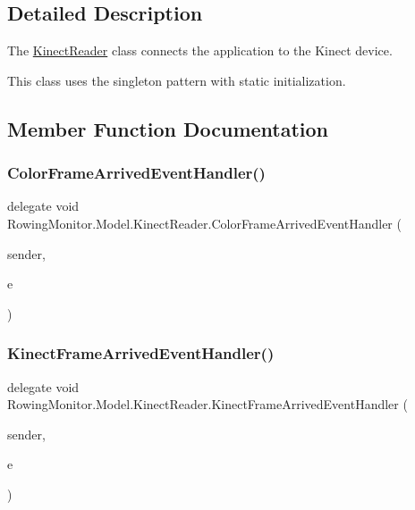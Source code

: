 \subsection{Detailed Description}
The \hyperlink{class_rowing_monitor_1_1_model_1_1_kinect_reader}{Kinect\+Reader} class connects the application to the Kinect device. 

This class uses the singleton pattern with static initialization. 

\subsection{Member Function Documentation}
\mbox{\label{class_rowing_monitor_1_1_model_1_1_kinect_reader_a2c9c0a937275cbabf12954725b54ddb8}} 
\subsubsection{\texorpdfstring{Color\+Frame\+Arrived\+Event\+Handler()}{ColorFrameArrivedEventHandler()}}
{\footnotesize\ttfamily delegate void Rowing\+Monitor.\+Model.\+Kinect\+Reader.\+Color\+Frame\+Arrived\+Event\+Handler (\begin{DoxyParamCaption}\item[{Object}]{sender,  }\item[{\hyperlink{class_rowing_monitor_1_1_model_1_1_color_frame_arrived_event_args}{Color\+Frame\+Arrived\+Event\+Args}}]{e }\end{DoxyParamCaption})}

\mbox{\label{class_rowing_monitor_1_1_model_1_1_kinect_reader_ae6568e9b233e8878ac21662617702571}} 
\subsubsection{\texorpdfstring{Kinect\+Frame\+Arrived\+Event\+Handler()}{KinectFrameArrivedEventHandler()}}
{\footnotesize\ttfamily delegate void Rowing\+Monitor.\+Model.\+Kinect\+Reader.\+Kinect\+Frame\+Arrived\+Event\+Handler (\begin{DoxyParamCaption}\item[{Object}]{sender,  }\item[{\hyperlink{class_rowing_monitor_1_1_model_1_1_kinect_frame_arrived_event_args}{Kinect\+Frame\+Arrived\+Event\+Args}}]{e }\end{DoxyParamCaption})}

